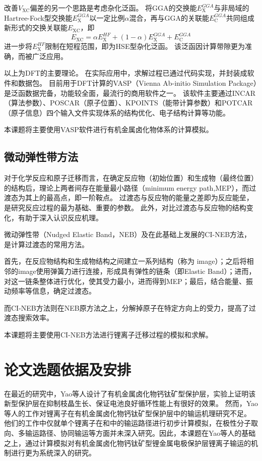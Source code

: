 改善$V_{\mathrm{XC}}$偏差的另一个思路是考虑杂化泛函。
将GGA的交换能$E^{GGA}_{\mathrm{X}}$与非局域的Hartree-Fock型交换能$E^{GGA}_{\mathrm{X}}$以一定比例$\alpha$混合，再与GGA的关联能$E^{GGA}_{\mathrm{C}}$共同组成新形式的交换关联能$E_{\mathrm{XC}}$，即
\begin{equation}
    E_{\mathrm{XC}}=\alpha E^{HF}_{\mathrm{X}}+(1-\alpha)E^{GGA}_{\mathrm{X}}+E^{GGA}_{\mathrm{C}}
\end{equation}
进一步将$E^{HF}_{\mathrm{X}}$限制在短程范围，即为HSE型杂化泛函。
该泛函因计算带隙更为准确，而被广泛应用。

以上为DFT的主要理论。
在实际应用中，求解过程已通过代码实现，并封装成软件和数据包。
目前用于DFT计算的VASP（Vienna Ab-initio Simulation Package）是泛函数据完备，功能较全面，最流行的商用软件之一。
该软件主要通过INCAR（算法参数）、POSCAR（原子位置）、KPOINTS（能带计算参数）和POTCAR（原子信息）四个输入文件实现体系的结构优化、电子结构计算等功能。

本课题将主要使用VASP软件进行有机金属卤化物体系的计算模拟。

\subsection{微动弹性带方法}

对于化学反应和原子迁移而言，在确定反应物（初始位置）和生成物（最终位置）的结构后，理论上两者间存在能量最小路径（minimum energy path,MEP），而过渡态为其上的最高点，即一阶鞍点。
过渡态与反应物的能量之差即为反应能垒，是研究反应过程的最为基础、重要的参数。
此外，对比过渡态与反应物的结构变化，有助于深入认识反应机理。

微动弹性带（Nudged Elastic Band，NEB）及在此基础上发展的CI-NEB方法，是计算过渡态的常用方法。

首先，在反应物结构和生成物结构之间建立一系列结构（称为 image）；之后将相邻的image使用弹簧力进行连接，形成具有弹性的链条（即Elastic Band）；进而，对这一链条整体进行优化，使其受力最小，进而得到MEP；最后，结合能量、振动频率等信息，确定过渡态。

而CI-NEB方法则在NEB原方法之上，分解掉原子在特定方向上的受力，提高了过渡态搜索效率。

本课题将主要使用CI-NEB方法进行锂离子迁移过程的模拟和求解。

\section{论文选题依据及安排}

在最近的研究中，Yao等人设计了有机金属卤化物钙钛矿型保护层，实验上证明该新型保护层在抑制枝晶生长、保证电池良好循环性能上有很好的效果。
然而，Yao等人的工作对锂离子在有机金属卤化物钙钛矿型保护层中的输运机理研究不足。
他们的工作中仅就单个锂离子在和中的输运路径进行初步计算模拟，在极性分子取向、多输运路径、协同输运等方面并未深入研究。因此，本课题在Yao等人的基础之上，通过计算模拟对有机金属卤化物钙钛矿型锂金属电极保护层锂离子输运的机制进行更为系统深入的研究。

